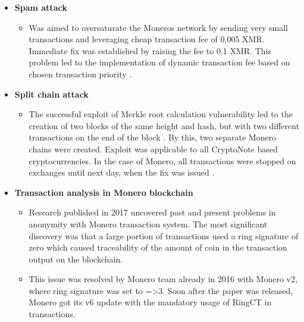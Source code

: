 \documentclass[
  printed, %
  table,   %
  nolof,     %
  nolot,     %
           oneside, color
]{fithesis3}
\begin{document}
\begin{itemize}
\item \textbf{Spam attack}
\begin{itemize}
\item Was aimed to oversaturate the Moneros network by sending very small transactions and leveraging cheap transaction fee of 0.005 XMR. Immediate fix was established by raising the fee to 0.1 XMR. This problem led to the implementation of dynamic transaction fee based on chosen transaction priority \cite{monerospamattack}.
\end{itemize}
\item \textbf{Split chain attack}
\begin{itemize}
\item The successful exploit of Merkle root calculation vulnerability led to the creation of two blocks of the same height and hash, but with two different transactions on the end of the block \cite{macheta2014counterfeiting}. By this, two separate Monero chains were created. Exploit was applicable to all CryptoNote based cryptocurrencies. In the case of Monero, all transactions were stopped on exchanges until next day, when the fix was issued \cite{cryptonotemerkletree}.
\end{itemize}
\item \textbf{Transaction analysis in Monero blockchain}
\begin{itemize}
\item Research published in 2017 uncovered past and present problems in anonymity with Monero transaction system. The most significant discovery was that a large portion of transactions used a ring signature of zero which caused traceability of the amount of coin in the transaction output on the blockchain.
\item This issue was resolved by Monero team already in 2016 with Monero v2, where ring signature was set to =>3. Soon after the paper was released, Monero got its v6 update with the mandatory usage of RingCT in transactions.
\end{itemize}
\end{itemize}
\newpage
\end{document}
